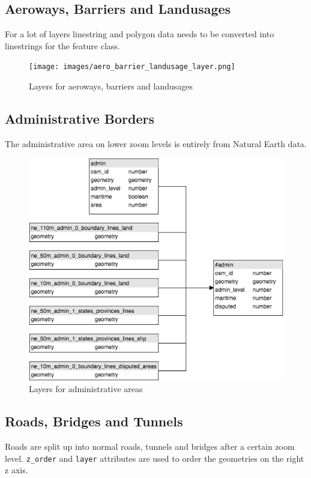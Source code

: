 \newpage
\subsection{Aeroways, Barriers and Landusages}

For a lot of layers linestring and polygon data needs to be converted into
linestrings for the feature class.

\begin{figure}[h]
  \centering
  \texttt{[image: images/aero\_barrier\_landusage\_layer.png]}
  \caption{Layers for aeroways, barriers and landusages}
\end{figure}

\newpage
\subsection{Administrative Borders}
The administrative area on lower zoom levels is entirely from Natural Earth data.

\begin{figure}[h]
  \centering
  \includegraphics[scale=0.6]{images/admin_layer.png}
  \caption{Layers for administrative areas}
\end{figure}

\newpage
\subsection{Roads, Bridges and Tunnels}
Roads are split up into normal roads, tunnels and bridges after a certain zoom level. \texttt{z\_order} and \texttt{layer} attributes are used to order the geometries on the right z axis.

